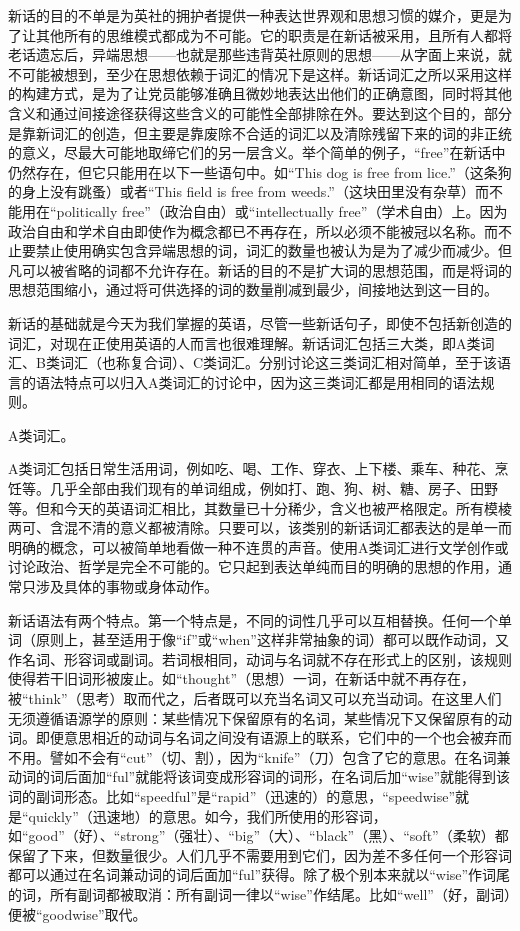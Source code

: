 新话的目的不单是为英社的拥护者提供一种表达世界观和思想习惯的媒介，更是为了让其他所有的思维模式都成为不可能。它的职责是在新话被采用，且所有人都将老话遗忘后，异端思想------也就是那些违背英社原则的思想------从字面上来说，就不可能被想到，至少在思想依赖于词汇的情况下是这样。新话词汇之所以采用这样的构建方式，是为了让党员能够准确且微妙地表达出他们的正确意图，同时将其他含义和通过间接途径获得这些含义的可能性全部排除在外。要达到这个目的，部分是靠新词汇的创造，但主要是靠废除不合适的词汇以及清除残留下来的词的非正统的意义，尽最大可能地取缔它们的另一层含义。举个简单的例子，``free''在新话中仍然存在，但它只能用在以下一些语句中。如``This
dog is free from lice.''（这条狗的身上没有跳蚤）或者``This field is free
from weeds.''（这块田里没有杂草）而不能用在``politically
free''（政治自由）或``intellectually
free''（学术自由）上。因为政治自由和学术自由即使作为概念都已不再存在，所以必须不能被冠以名称。而不止要禁止使用确实包含异端思想的词，词汇的数量也被认为是为了减少而减少。但凡可以被省略的词都不允许存在。新话的目的不是扩大词的思想范围，而是将词的思想范围缩小，通过将可供选择的词的数量削减到最少，间接地达到这一目的。

新话的基础就是今天为我们掌握的英语，尽管一些新话句子，即使不包括新创造的词汇，对现在正使用英语的人而言也很难理解。新话词汇包括三大类，即A类词汇、B类词汇（也称复合词）、C类词汇。分别讨论这三类词汇相对简单，至于该语言的语法特点可以归入A类词汇的讨论中，因为这三类词汇都是用相同的语法规则。

A类词汇。

A类词汇包括日常生活用词，例如吃、喝、工作、穿衣、上下楼、乘车、种花、烹饪等。几乎全部由我们现有的单词组成，例如打、跑、狗、树、糖、房子、田野等。但和今天的英语词汇相比，其数量已十分稀少，含义也被严格限定。所有模棱两可、含混不清的意义都被清除。只要可以，该类别的新话词汇都表达的是单一而明确的概念，可以被简单地看做一种不连贯的声音。使用A类词汇进行文学创作或讨论政治、哲学是完全不可能的。它只起到表达单纯而目的明确的思想的作用，通常只涉及具体的事物或身体动作。

新话语法有两个特点。第一个特点是，不同的词性几乎可以互相替换。任何一个单词（原则上，甚至适用于像``if''或``when''这样非常抽象的词）都可以既作动词，又作名词、形容词或副词。若词根相同，动词与名词就不存在形式上的区别，该规则使得若干旧词形被废止。如``thought''（思想）一词，在新话中就不再存在，被``think''（思考）取而代之，后者既可以充当名词又可以充当动词。在这里人们无须遵循语源学的原则：某些情况下保留原有的名词，某些情况下又保留原有的动词。即便意思相近的动词与名词之间没有语源上的联系，它们中的一个也会被弃而不用。譬如不会有``cut''（切、割），因为``knife''（刀）包含了它的意思。在名词兼动词的词后面加``ful''就能将该词变成形容词的词形，在名词后加``wise''就能得到该词的副词形态。比如``speedful''是``rapid''（迅速的）的意思，``speedwise''就是``quickly''（迅速地）的意思。如今，我们所使用的形容词，如``good''（好）、``strong''（强壮）、``big''（大）、``black''（黑）、``soft''（柔软）都保留了下来，但数量很少。人们几乎不需要用到它们，因为差不多任何一个形容词都可以通过在名词兼动词的词后面加``ful''获得。除了极个别本来就以``wise''作词尾的词，所有副词都被取消：所有副词一律以``wise''作结尾。比如``well''（好，副词）便被``goodwise''取代。

